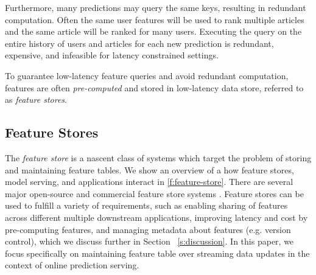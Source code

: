 Furthermore, many predictions may query the same keys, resulting in redundant computation. Often the same user features will be used to rank multiple articles and the same article will be ranked for many users. Executing the query on the entire history of users and articles for each new prediction is redundant, expensive, and infeasible for latency constrained settings.




To guarantee low-latency feature queries and avoid redundant computation, features are often \textit{pre-computed} and stored in low-latency data store, referred to as \textit{feature stores}. 




\subsection{Feature Stores}
The \emph{feature store} is a nascent class of systems which target the problem of storing and maintaining feature tables. We show an overview of a how feature stores, model serving, and applications interact in \cref{f:feature-store}. There are several major open-source and commercial feature store systems \cite{featurestoresorg,tecton, hopsworks, amazon}. Feature stores can be used to fulfill a variety of requirements, such as enabling sharing of features across different multiple downstream applications, improving latency and cost by pre-computing features, and managing metadata about features (e.g. version control), which we discuss further in Section ~\ref{s:discussion}. In this paper, we focus specifically on maintaining feature table over streaming data updates in the context of online prediction serving. 

